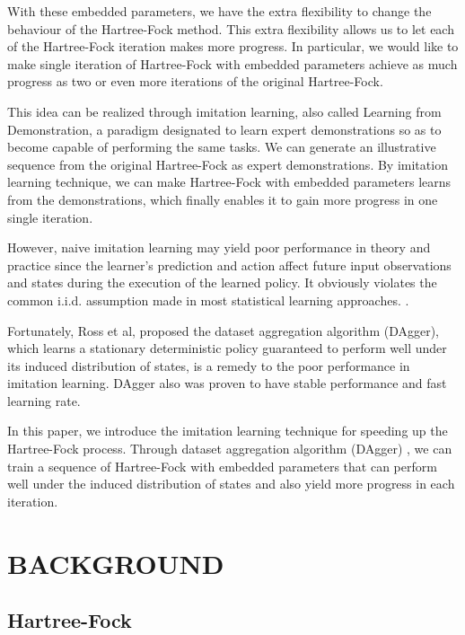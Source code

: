 \documentclass[twoside]{article}
\begin{document}
With these embedded parameters,  we have the extra flexibility to change the behaviour of the Hartree-Fock method. This extra flexibility allows us to let each of the Hartree-Fock iteration makes more progress. In particular, we would like to make single iteration of Hartree-Fock with embedded parameters achieve as much progress as two or even more iterations of the original Hartree-Fock.

This idea can be realized through imitation learning, also called Learning from Demonstration, a paradigm designated to learn expert demonstrations so as to become capable of performing the same tasks. 
We can generate an illustrative sequence from the original Hartree-Fock as expert demonstrations. By imitation learning technique, we can make 
Hartree-Fock with embedded parameters learns from the demonstrations,  which finally enables it to gain more progress in one single iteration.


However, naive imitation learning may yield poor performance in theory and practice since the learner's prediction and action affect future input observations and states during the execution of the learned policy. It obviously violates the common i.i.d. assumption made in most statistical learning approaches. \cite{Ross}.


Fortunately, Ross et al,\cite{DAgger} proposed the dataset aggregation algorithm (DAgger), which learns a stationary deterministic policy guaranteed to perform well under its induced distribution of states, is a remedy to the poor performance in imitation learning. DAgger also was proven to have stable performance and fast learning rate. \cite{DAggerCompare}

In this paper,  we introduce the imitation learning technique for speeding up the Hartree-Fock process. 
Through dataset aggregation algorithm (DAgger) \cite{DAgger}, we can train a sequence of Hartree-Fock with embedded parameters that can perform well under the induced distribution of states and also yield more progress in each iteration. 


\section{BACKGROUND}

\subsection{Hartree-Fock}
\end{document}
